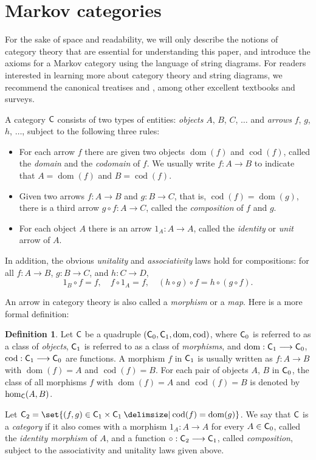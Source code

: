 \documentclass[12pt]{amsart}
\theoremstyle{plain}
\theoremstyle{definition}
\newtheorem{defn}[thm]{Definition}
\theoremstyle{remark}
\numberwithin{equation}{section}
\theoremstyle{plain}
\DeclareMathOperator{\dom}{dom}
\DeclareMathOperator{\cod}{cod}
\newcommand{\0}{\emptyset}
\providecommand\given{}
\newcommand\SetSymbol[1][]{%
\nonscript \: #1 \vert
\allowbreak
\nonscript\:
\mathopen{}}
\renewcommand\given{\SetSymbol[\delimsize]}
\newcommand{\fun}{\longrightarrow}
\newcommand{\cat}[1]{\textup{\textsf{#1}}}
\newcommand{\memph}[1]{{\color{magenta}\emph{#1}}}
\begin{document}
\section{Markov categories}
\label{sec:cat}
For the sake of space and readability, we will only describe the notions of category theory that are essential for understanding this paper, and introduce the axioms for a Markov category using the language of string diagrams. For readers interested in learning more about category theory and string diagrams, we recommend the canonical treatises \cite{MacLane1998} and  \cite{selinger2010survey}, among other excellent textbooks and surveys.

A category $\cat C$ consists of two types of entities: \memph{objects} $A$, $B$, $C$, $\ldots$ and \memph{arrows} $f$, $g$, $h$, $\ldots$, subject to the following three rules:
\begin{itemize}
 \item For each arrow $f$ there are given two objects $\dom(f)$ and $\cod(f)$, called the \memph{domain} and the \memph{codomain} of $f$. We usually write $f :A \fun B$ to indicate that $A = \dom(f)$ and  $B = \cod(f)$.
 \item Given two arrows $f : A \fun B$ and $g: B \fun C$, that is, $\cod(f) = \dom(g)$, there is a third arrow $g \circ f : A \fun C$, called the \memph{composition} of $f$ and $g$.
 \item  For each object $A$ there is an arrow $1_A : A \fun A$, called the \memph{identity} or \memph{unit} arrow of $A$.
\end{itemize}
In addition, the obvious \memph{unitality} and \memph{associativity} laws hold for compositions: for all $f : A \fun B$, $g : B \fun C$, and $h : C \fun D$,
\[
1_B \circ f = f, \quad f \circ 1_A = f, \quad (h \circ g) \circ f = h \circ (g \circ f).
\]

An arrow in category theory is also called a \memph{morphism} or a \memph{map}. Here is a more formal definition:

\begin{defn}\label{cat:def:2}
Let $\cat C$ be a quadruple $(\cat C_0, \cat C_1, \dom, \cod)$, where $\cat C_0$ is referred to as a class of \memph{objects},  $\cat C_1$ is referred to as a class of \memph{morphisms}, and $\dom : \cat C_1 \fun \cat C_0$, $\cod : \cat C_1 \fun \cat C_0$ are functions. A morphism $f$ in $\cat C_1$ is usually written as $f : A \fun B$ with $\dom(f) = A$ and $\cod(f) = B$. For each pair of objects $A$, $B$ in $\cat C_0$, the class of all morphisms $f$ with  $\dom(f) = A$ and $\cod(f) = B$ is denoted by $\hom_{\cat C}(A,B)$.

Let $\cat C_2 = \set{(f, g) \in \cat C_1 \times \cat C_1 \given \cod(f) = \dom (g)}$. We say that $\cat C$ is a \memph{category} if it also comes with a morphism $1_A : A \fun A$ for every $A \in \cat C_0$, called the \memph{identity morphism} of $A$, and a function $\circ : \cat C_2 \fun \cat C_1$, called \memph{composition}, subject to the associativity and unitality laws given above.
\end{defn}
\end{document}
